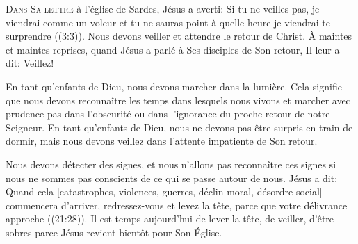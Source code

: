 



\lettrine{D}{ans Sa lettre} à l'église de Sardes,
 Jésus a averti: 
 \Og Si tu ne veilles pas, je viendrai comme un voleur et tu ne sauras point
 à quelle heure je viendrai te surprendre \Fg{} ((3:3)).
 Nous devons veiller et attendre le retour de Christ.
 À maintes et maintes reprises, quand Jésus a parlé à Ses disciples
 de Son retour, Il leur a dit:  \Og Veillez! \Fg{}


En tant qu'enfants de Dieu, nous devons marcher dans la lumière.
 Cela signifie que nous devons reconnaître les temps dans lesquels nous vivons
 et marcher avec prudence \ocadr pas dans l'obscurité ou dans l'ignorance
 du proche retour de notre Seigneur. En tant qu'enfants de Dieu,
 nous ne devons pas être surpris en train de dormir,
 mais nous devons veillez dans l'attente impatiente de Son retour.

Nous devons détecter des signes, et nous n'allons pas reconnaître ces signes
 si nous ne sommes pas conscients de ce qui se passe autour de nous.
 Jésus a dit: 
 \Og Quand cela [catastrophes, violences, guerres, déclin moral,
 désordre social] commencera d'arriver, redressez-vous et levez la tête,
 parce que votre délivrance approche \Fg{} ((21:28)).
 Il est temps aujourd'hui de lever la tête, de veiller, d'être sobres
 \ocadr parce Jésus revient bientôt pour Son Église.

\dvrule







